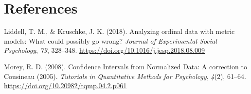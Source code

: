 \documentclass[
  man,floatsintext]{apa7}
\newlength{\cslhangindent}
\newlength{\cslentryspacingunit} %
\newenvironment{CSLReferences}[2] %
 {%
  \setlength{\parindent}{0pt}
  \ifodd #1
  \let\oldpar\par
  \def\par{\hangindent=\cslhangindent\oldpar}
  \fi
  \setlength{\parskip}{#2\cslentryspacingunit}
 }%
 {}
\begin{document}
\newpage

\hypertarget{references}{%
\section{References}\label{references}}

\hypertarget{refs}{}
\begin{CSLReferences}{1}{0}
\leavevmode{}%
Liddell, T. M., \& Kruschke, J. K. (2018). Analyzing ordinal data with metric models: {What} could possibly go wrong? \emph{Journal of Experimental Social Psychology}, \emph{79}, 328--348. \url{https://doi.org/10.1016/j.jesp.2018.08.009}

\leavevmode{}%
Morey, R. D. (2008). Confidence {Intervals} from {Normalized Data}: {A} correction to {Cousineau} (2005). \emph{Tutorials in Quantitative Methods for Psychology}, \emph{4}(2), 61--64. \url{https://doi.org/10.20982/tqmp.04.2.p061}

\end{CSLReferences}
\end{document}

